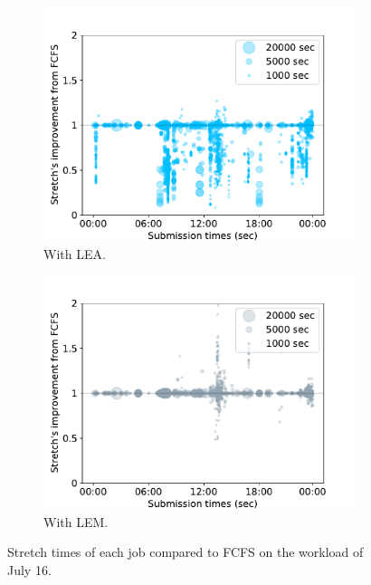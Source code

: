 \documentclass[conference,10pt]{IEEEtran}
\begin{document}
\begin{figure}[t]\begin{subfigure}[b]{0.49\linewidth}\centering\includegraphics[width=1\linewidth]{../MBSS/plot/Stretch_times/Stretch_times_FCFS_LEA_2022-07-16->2022-07-16_V10000_450_128_32_256_4_1024.pdf}\caption{With LEA.}\label{07_16_fcfs_vs_lea}\end{subfigure}
\begin{subfigure}[b]{0.49\linewidth}\centering\includegraphics[width=1\linewidth]{../MBSS/plot/Stretch_times/Stretch_times_FCFS_LEM_2022-07-16->2022-07-16_V10000_450_128_32_256_4_1024.pdf}\caption{With LEM.}\label{07_16_fcfs_vs_lem}\end{subfigure}\caption{Stretch times of each job compared to FCFS on the workload of July 16.}\end{figure}
\end{document}
